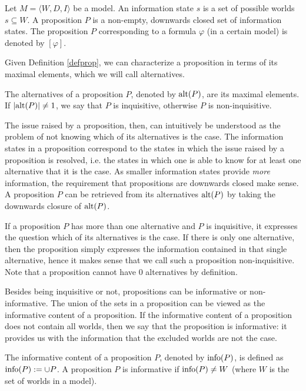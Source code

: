 \begin{defi}\label{defprop}
 Let $M=\langle W,D,I\rangle$ be a model. An information state $s$ is a set of possible worlds $s\subseteq W$. A proposition $P$ is a non-empty, downwards closed set of information states. The proposition $P$ corresponding to a formula $\varphi$ (in a certain model) is denoted by $[\varphi]$.
\end{defi}

Given Definition \ref{defprop}, we can characterize a proposition in terms of its maximal elements, which we will call alternatives. 

\begin{defi}\label{defalt}
 The alternatives of a proposition $P$, denoted by $\textrm{alt}(P)$, are its maximal elements. If $|\textrm{alt}(P)|\neq 1$, we say that $P$ is inquisitive, otherwise $P$ is non-inquisitive.
\end{defi}

The issue raised by a proposition, then, can intuitively be understood as the problem of not knowing which of its alternatives is the case. The information states in a proposition correspond to the states in which the issue raised by a proposition is resolved, i.e. the states in which one is able to know for at least one alternative that it is the case. As smaller information states provide \emph{more} information, the requirement that propositions are downwards closed make sense. A proposition $P$ can be retrieved from its alternatives $\textrm{alt}(P)$ by taking the downwards closure of $\textrm{alt}(P)$.

If a proposition $P$ has more than one alternative and $P$ is inquisitive, it expresses the question which of its alternatives is the case. If there is only one alternative, then the proposition simply expresses the information contained in that single alternative, hence it makes sense that we call such a proposition non-inquisitive. Note that a proposition cannot have $0$ alternatives by definition.

Besides being inquisitive or not, propositions can be informative or non-informative. The union of the sets in a proposition can be viewed as the informative content of a proposition. If the informative content of a proposition does not contain all worlds, then we say that the proposition is informative: it provides us with the information that the excluded worlds are not the case. 

\begin{defi}\label{definfo}
 The informative content of a proposition $P$, denoted by $\textrm{info}(P)$, is defined as $\textrm{info}(P):=\cup P$. A proposition $P$ is informative if $\textrm{info}(P)\neq W$ (where $W$ is the set of worlds in a model).
\end{defi}

